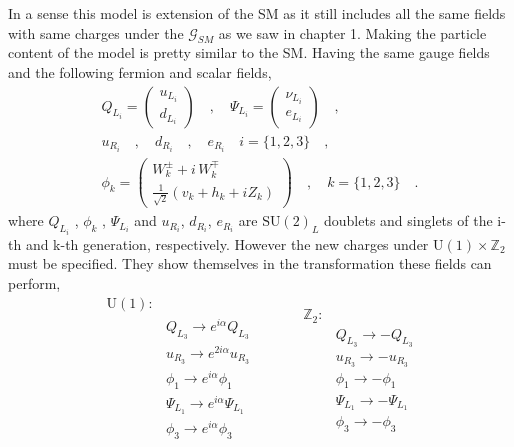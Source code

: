 In a sense this model is extension of the SM as it still includes all the same fields with same charges under the $\mathcal{G}_{SM}$ as we saw in chapter 1. 
% 
Making the particle content of the model is pretty similar to the SM. 
%
Having the same gauge fields and the following fermion and scalar fields,
%
\begin{equation}
\label{eq:3HDM_Fields}
\begin{gathered}
Q_{L_i} =  \begin{pmatrix}
u_{L_i}  \\
d_{L_i}
\end{pmatrix} \quad , \quad \Psi_{L_i} =  \begin{pmatrix}
\nu_{L_i}  \\
e_{L_i}
\end{pmatrix} \quad , \quad \\ 
u_{R_i} \quad , \quad d_{R_i} \quad , \quad e_{R_i} \quad i=\{1,2,3\} \quad ,  \\  
\phi_k = \begin{pmatrix}
W_k^\pm + i \, W_k^\mp \\ 
\frac{1}{\sqrt{2}}\left( v_k + h_k + i Z_k \right) 
\end{pmatrix}  \quad , \quad k=\{ 1,2,3\} \quad . 
\end{gathered} 
\end{equation}
%
where $Q_{L_i}$ , $\phi_k$ , $\Psi_{L_i}$ and $u_{R_i}$, $d_{R_i}$, $e_{R_i}$ are $\mathrm{SU}(2)_L$ doublets and singlets of the i-th and k-th generation, respectively. 
%
However the new charges under $\mathrm{U(1)}\times\mathbb{Z}_2$ must be specified. 
%
They show themselves in the transformation these fields can perform, 
%
\begin{equation}
\label{eq:3HDM_Transformations}
	\begin{split} 
	\mathrm{U(1)} : & \\
		& Q_{L_3} \rightarrow    e^{i \alpha} Q_{L_3}  \\  
		& u_{R_3} \rightarrow    e^{2 i \alpha} u_{R_3}  \\
		& \phi_1  \rightarrow    e^{i \alpha} \phi_1  \\   
		& \Psi_{L_1} \rightarrow e^{i \alpha} \Psi_{L_1} \\
		& \phi_3 \rightarrow     e^{i \alpha} \phi_3  \\ 
	\end{split} \quad \quad \quad  
	\begin{split}
		\mathbb{Z}_2 : & \\
		 	& Q_{L_3} \rightarrow -Q_{L_3} \\
		 	& u_{R_3} \rightarrow -u_{R_3} \\ 
		 	& \phi_1  \rightarrow -\phi_1 \\ 
		 	& \Psi_{L_1} \rightarrow - \Psi_{L_1} \\ 
		 	& \phi_3 \rightarrow -\phi_3
	\end{split} 
\end{equation} 
